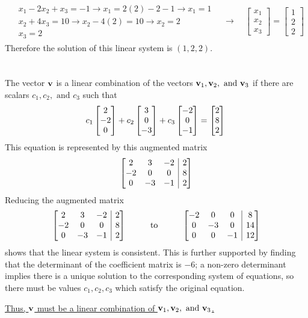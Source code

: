 \documentclass[]{article}
\makeatletter
\newenvironment{augmx}[1]{%
	\left[\begin{array}{@{}*{#1}{c}|c@{}}
	}{%
	\end{array}\right]
}
\newcommand{\bmat}[1]{\begin{bmatrix}#1\end{bmatrix}}
\makeatother
\begin{document}
	\begin{gather*}
	\begin{aligned}
		& x_1 - 2x_2 + x_3 = -1 \rightarrow x_1 = 2(2) - 2 - 1 \rightarrow x_1 = 1\\
		& x_2 + 4x_3 = 10 \rightarrow x_2 - 4(2) = 10 \rightarrow x_2 = 2\\
		& x_3 = 2
	\end{aligned} \quad \longrightarrow \quad
	\bmat{x_1\\x_2\\x_3} = \bmat{1\\2\\2}
	\end{gather*}
	Therefore the solution of this linear system is $\boxed{(1, 2, 2)}$.
	
\section{}
The vector $\vb{v}$ is a linear combination of the vectors $\vb{v}_1, \vb{v}_2, \text{ and } \vb{v}_3$ if there are scalars $c_1, c_2, \text{ and } c_3$ such that
\[
	c_1\bmat{2\\-2\\0} + c_2\bmat{3\\0\\-3} + c_3\bmat{-2\\0\\-1} = \bmat{2\\8\\2}\\
\]
This equation is represented by this augmented matrix
\[ \begin{augmx}{3} 2&3&-2&2\\-2&0&0&8\\0&-3&-1&2 \end{augmx} \]
Reducing the augmented matrix
\[
\begin{array}{ccc}
	\begin{augmx}{3} 2&3&-2&2\\-2&0&0&8\\0&-3&-1&2 \end{augmx} & \qquad \text{to} \qquad & \begin{augmx}{3} -2&0&0&8\\0&-3&0&14\\0&0&-1&12 \end{augmx}
\end{array}
\]
shows that the linear system is consistent. This is further supported by finding that the determinant of the coefficient matrix is $-6$; a non-zero determinant implies there is a unique solution to the corresponding system of equations, so there must be values $c_1, c_2, c_3$ which satisfy the original equation.\par
\underline{Thus, $\vb{v}$ must be a linear combination of $\vb{v}_1, \vb{v}_2, \text{ and } \vb{v}_3$.}
\end{document}
